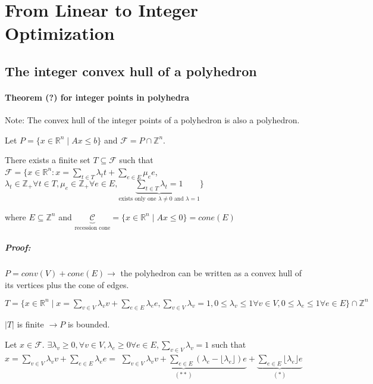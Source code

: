 \documentclass[main]{subfiles}
\begin{document}

\section{From Linear to Integer Optimization}

\subsection{The integer convex hull of a polyhedron }
\paragraph{Theorem (?) for integer points in polyhedra}
Note: The convex hull of the integer points of a polyhedron is also a polyhedron.

Let $P = \{ x \in \mathbb{R}^n \mid Ax \leq b \}$ and $\mathcal{F} = P \cap \mathbb{Z}^n$.

There exists a finite set $T \subseteq \mathcal{F}$ such that \\
$\mathcal{F} = \{ x \in \mathbb{R}^n : x = \sum_{t \in T} \lambda_{t}t + \sum_{e \in E} \mu_{e}e$, $\lambda_t \in \mathbb{Z}_+ \forall t \in T, \mu_e \in \mathbb{Z}_+ \forall e \in E, \underbrace{\sum_{t \in T} \lambda_t = 1}_{\text{exists only one $\lambda \neq 0$ and $\lambda = 1$}} \}$

where $E \subseteq \mathbb{Z}^n$ and $\underbrace{\mathcal{C}}_{\text{recession cone}} = \{ x \in \mathbb{R}^n \mid Ax \leq 0 \} = cone(E)$

\subparagraph{Proof:}
$P = conv(V) + cone(E) \rightarrow$ the polyhedron can be written as a convex hull of its vertices plus the cone of edges.

$T = \{x \in \mathbb{R}^n \mid x = \sum_{v \in V} \lambda_v v + \sum_{e \in E} \lambda_e e, \sum_{v \in V} \lambda_v = 1, 0 \leq \lambda_v \leq 1 \forall v \in V, 0 \leq \lambda_e \leq 1 \forall e \in E \} \cap \mathbb{Z}^n$

$|T|$ is finite $\rightarrow P$ is bounded.

Let $x \in \mathcal{F}$. $\exists \lambda_v \geq 0, \forall v \in V, \lambda_e \geq 0 \forall e \in E, \sum_{v \in V} \lambda_v = 1$ such that $x = \sum_{v \in V} \lambda_v v + \sum_{e \in E} \lambda_e e =$
$\underbrace{\sum_{v \in V} \lambda_v v + \sum_{e \in E} (\lambda_e - \lfloor \lambda_e \rfloor)e}_{(**)} + \underbrace{\sum_{e \in E} \lfloor \lambda_e \rfloor e}_{(*)}$
\end{document}
